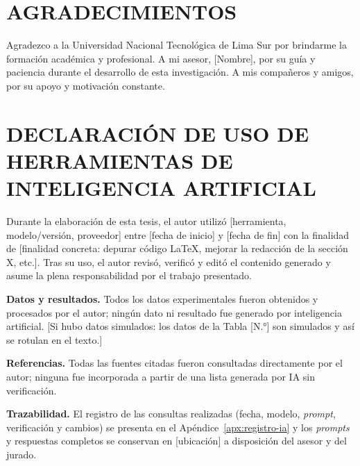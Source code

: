 \documentclass[12pt, letterpaper, oneside]{book}
\begin{document}
\newpage
\chapter*{AGRADECIMIENTOS}

Agradezco a la Universidad Nacional Tecnológica de Lima Sur por brindarme la formación académica y profesional. A mi asesor, [Nombre], por su guía y paciencia durante el desarrollo de esta investigación. A mis compañeros y amigos, por su apoyo y motivación constante.

\newpage
\chapter*{DECLARACIÓN DE USO DE HERRAMIENTAS DE INTELIGENCIA ARTIFICIAL}

Durante la elaboración de esta tesis, el autor utilizó [herramienta, modelo/versión, proveedor] entre [fecha de inicio] y [fecha de fin] con la finalidad de [finalidad concreta: depurar código \LaTeX, mejorar la redacción de la sección X, etc.]. Tras su uso, el autor revisó, verificó y editó el contenido generado y asume la plena responsabilidad por el trabajo presentado.

\textbf{Datos y resultados.} Todos los datos experimentales fueron obtenidos y procesados por el autor; ningún dato ni resultado fue generado por inteligencia artificial. [Si hubo datos simulados: los datos de la Tabla [N.°] son simulados y así se rotulan en el texto.]

\textbf{Referencias.} Todas las fuentes citadas fueron consultadas directamente por el autor; ninguna fue incorporada a partir de una lista generada por IA sin verificación.

\textbf{Trazabilidad.} El registro de las consultas realizadas (fecha, modelo, \textit{prompt}, verificación y cambios) se presenta en el Apéndice~\ref{apx:registro-ia} y los \textit{prompts} y respuestas completos se conservan en [ubicación] a disposición del asesor y del jurado.
\end{document}
